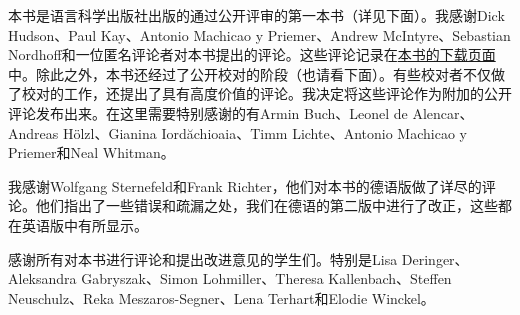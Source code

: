 
本书是语言科学出版社出版的通过公开评审的第一本书（详见下面）。我感谢Dick Hudson、Paul Kay、Antonio Machicao y Priemer、Andrew McIntyre、Sebastian Nordhoff和一位匿名评论者对本书提出的评论。这些评论记录在\href{\lsURL}{本书的下载页面}中。除此之外，本书还经过了公开校对的阶段（也请看下面）。有些校对者不仅做了校对的工作，还提出了具有高度价值的评论。我决定将这些评论作为附加的公开评论发布出来。在这里需要特别感谢的有Armin Buch、Leonel de Alencar、Andreas Hölzl、Gianina Iordăchioaia、Timm Lichte、Antonio Machicao y Priemer和Neal Whitman。

我感谢Wolfgang Sternefeld和Frank Richter，他们对本书的德语版做了详尽的评论。他们指出了一些错误和疏漏之处，我们在德语的第二版中进行了改正，这些都在英语版中有所显示。

感谢所有对本书进行评论和提出改进意见的学生们。特别是Lisa Deringer、Aleksandra Gabryszak、Simon Lohmiller、Theresa Kallenbach、Steffen Neu\-schulz、Reka Meszaros-Segner、Lena Terhart和Elodie Winckel。

